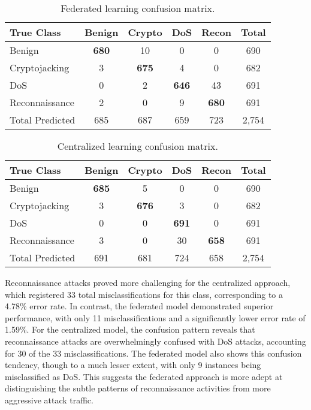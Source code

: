 \begin{table}[H]
	\centering
	\renewcommand{\arraystretch}{1.15}
	\setlength{\tabcolsep}{8pt}
	\caption{Federated learning confusion matrix.}
	\label{table:federated-confusion}
	\begin{tabular}{@{}lcccc|c@{}}
		\toprule
		\textbf{True Class} & \textbf{Benign} & \textbf{Crypto} & \textbf{DoS} & \textbf{Recon} & \textbf{Total} \\
		\midrule
		Benign & \textbf{680} & 10 & 0 & 0 & 690 \\
		Cryptojacking & 3 & \textbf{675} & 4 & 0 & 682 \\
		DoS & 0 & 2 & \textbf{646} & 43 & 691 \\
		Reconnaissance & 2 & 0 & 9 & \textbf{680} & 691 \\
		\midrule
		Total Predicted & 685 & 687 & 659 & 723 & 2,754 \\
		\bottomrule
	\end{tabular}
\end{table}

\begin{table}[H]
	\centering
	\renewcommand{\arraystretch}{1.15}
	\setlength{\tabcolsep}{8pt}
	\caption{Centralized learning confusion matrix.}
	\label{table:centralized-confusion}
	\begin{tabular}{@{}lcccc|c@{}}
		\toprule
		\textbf{True Class} & \textbf{Benign} & \textbf{Crypto} & \textbf{DoS} & \textbf{Recon} & \textbf{Total} \\
		\midrule
		Benign & \textbf{685} & 5 & 0 & 0 & 690 \\
		Cryptojacking & 3 & \textbf{676} & 3 & 0 & 682 \\
		DoS & 0 & 0 & \textbf{691} & 0 & 691 \\
		Reconnaissance & 3 & 0 & 30 & \textbf{658} & 691 \\
		\midrule
		Total Predicted & 691 & 681 & 724 & 658 & 2,754 \\
		\bottomrule
	\end{tabular}
\end{table}

Reconnaissance attacks proved more challenging for the centralized approach, which registered 33 total misclassifications for this class, corresponding to a 4.78\% error rate. In contrast, the federated model demonstrated superior performance, with only 11 misclassifications and a significantly lower error rate of 1.59\%. For the centralized model, the confusion pattern reveals that reconnaissance attacks are overwhelmingly confused with DoS attacks, accounting for 30 of the 33 misclassifications. The federated model also shows this confusion tendency, though to a much lesser extent, with only 9 instances being misclassified as DoS. This suggests the federated approach is more adept at distinguishing the subtle patterns of reconnaissance activities from more aggressive attack traffic. \\

